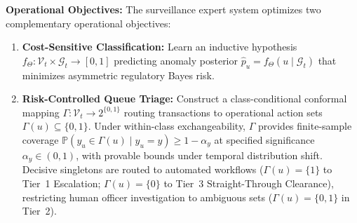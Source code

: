 \textbf{Operational Objectives:} The surveillance expert system optimizes two complementary operational objectives:
\begin{enumerate}
    \item \textbf{Cost-Sensitive Classification:} Learn an inductive hypothesis $f_\Theta: \mathcal{V}_t \times \mathcal{G}_t \to [0, 1]$ predicting anomaly posterior $\hat{p}_u = f_\Theta(u \mid \mathcal{G}_t)$ that minimizes asymmetric regulatory Bayes risk.
    \item \textbf{Risk-Controlled Queue Triage:} Construct a class-conditional conformal mapping $\Gamma: \mathcal{V}_t \to 2^{\{0, 1\}}$ routing transactions to operational action sets $\Gamma(u) \subseteq \{0, 1\}$. Under within-class exchangeability, $\Gamma$ provides finite-sample coverage $\mathbb{P}(y_u \in \Gamma(u) \mid y_u = y) \ge 1 - \alpha_y$ at specified significance $\alpha_y \in (0, 1)$, with provable bounds under temporal distribution shift. Decisive singletons are routed to automated workflows ($\Gamma(u) = \{1\}$ to Tier~1 Escalation; $\Gamma(u) = \{0\}$ to Tier~3 Straight-Through Clearance), restricting human officer investigation to ambiguous sets ($\Gamma(u) = \{0, 1\}$ in Tier~2).
\end{enumerate}

